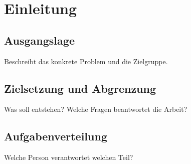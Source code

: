 \chapter{Einleitung}\label{chap:einleitung}
\section{Ausgangslage}
Beschreibt das konkrete Problem und die Zielgruppe.
\section{Zielsetzung und Abgrenzung}
Was soll entstehen? Welche Fragen beantwortet die Arbeit?
\section{Aufgabenverteilung}
Welche Person verantwortet welchen Teil?
